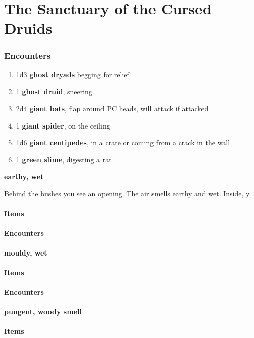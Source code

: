 \chapter*{The Sanctuary of the Cursed Druids}

\subsection{Encounters}
\begin{enumerate}
    \item 1d3 \textbf{ghost dryads} begging for relief
    \item 1 \textbf{ghost druid}, sneering
    \item 2d4 \textbf{giant bats}, flap around PC heads, will attack if attacked
    \item 1 \textbf{giant spider}, on the ceiling
    \item 1d6 \textbf{giant centipedes}, in a crate or coming from a crack in the wall
    \item 1 \textbf{green slime}, digesting a rat
\end{enumerate}

\textbf{earthy, wet}
\begin{DndReadAloud}
    Behind the bushes you see an opening. The air smells earthy and wet.
    Inside, y
\end{DndReadAloud}
\subsubsection{Items}
\subsubsection{Encounters}

\textbf{mouldy, wet}
\begin{DndReadAloud}
\end{DndReadAloud}
\subsubsection{Items}
\subsubsection{Encounters}

\textbf{pungent, woody smell}
\begin{DndReadAloud}
\end{DndReadAloud}
\subsubsection{Items}
